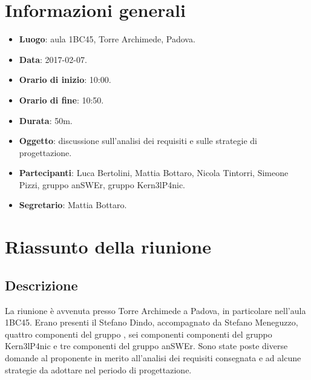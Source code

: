 \documentclass[a4paper,titlepage]{article}
\begin{document}
\maketitle
\begin{diario}
\end{diario}
\newpage
\tableofcontents

\newpage
\section{Informazioni generali}
\label{sec:Informazioni}

\begin{itemize}
  \item \textbf{Luogo}: aula 1BC45, Torre Archimede, Padova.
  \item \textbf{Data}: 2017-02-07.
  \item \textbf{Orario di inizio}: 10:00.
  \item \textbf{Orario di fine}: 10:50.
  \item \textbf{Durata}: 50m.
  \item \textbf{Oggetto}: discussione sull'analisi dei requisiti e sulle strategie di progettazione.
  \item \textbf{Partecipanti}: Luca Bertolini, Mattia Bottaro, Nicola Tintorri, Simeone Pizzi, gruppo anSWEr, gruppo Kern3lP4nic.
  \item \textbf{Segretario}: Mattia Bottaro.

\end{itemize}
\section{Riassunto della riunione}
\label{sec:RiassuntoRiunione}
 \subsection{Descrizione}
La riunione è avvenuta presso Torre Archimede a Padova, in particolare nell'aula 1BC45. Erano presenti il  Stefano Dindo, accompagnato da Stefano Meneguzzo, quattro componenti del gruppo \GRUPPO{}, sei componenti componenti del gruppo Kern3lP4nic e tre componenti del gruppo anSWEr. Sono state poste diverse domande al proponente in merito all'analisi dei requisiti consegnata e ad alcune strategie da adottare nel periodo di progettazione.
\end{document}
